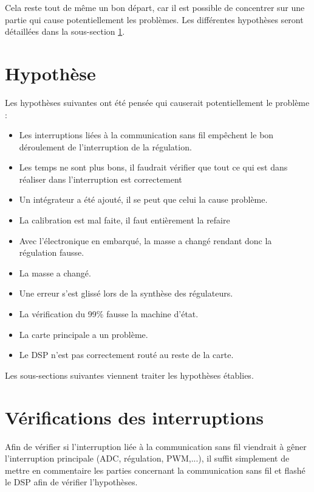 Cela reste tout de même un bon départ, car il est possible de concentrer sur une partie qui cause potentiellement les problèmes. Les différentes hypothèses seront détaillées dans la sous-section \ref{sec:Hypothese}.

\section{Hypothèse}
\label{sec:Hypothese}

Les hypothèses suivantes ont été pensée qui causerait potentiellement le problème :

\begin{itemize}
    \item Les interruptions liées à la communication sans fil empêchent le bon déroulement de l'interruption de la régulation.
    \item Les temps ne sont plus bons, il faudrait vérifier que tout ce qui est dans réaliser dans l'interruption est correctement
    \item Un intégrateur a été ajouté, il se peut que celui la cause problème.
    \item La calibration est mal faite, il faut entièrement la refaire
    \item Avec l'électronique en embarqué, la masse a changé rendant donc la régulation fausse.
    \item La masse a changé.
    \item Une erreur s'est glissé lors de la synthèse des régulateurs.
    \item La vérification du 99\% fausse la machine d'état.
    \item La carte principale a un problème.
    \item Le DSP n'est pas correctement routé au reste de la carte.
\end{itemize}

Les sous-sections suivantes viennent traiter les hypothèses établies.

\section{Vérifications des interruptions}

Afin de vérifier si l'interruption liée à la communication sans fil viendrait à gêner l'interruption principale (ADC, régulation, PWM,...), il suffit simplement de mettre en commentaire les parties concernant la communication sans fil et flashé le DSP afin de vérifier l'hypothèses.\\

